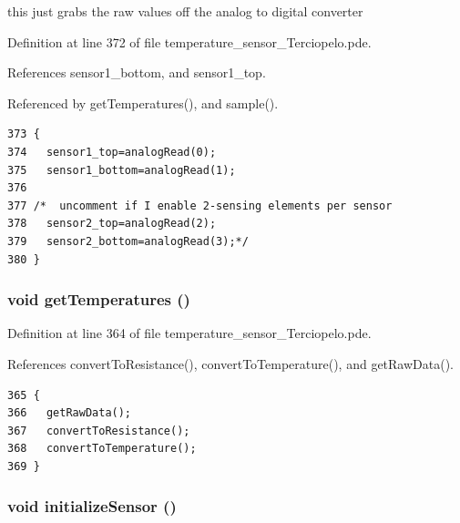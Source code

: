 this just grabs the raw values off the analog to digital converter 



Definition at line 372 of file temperature\_\-sensor\_\-Terciopelo.pde.

References sensor1\_\-bottom, and sensor1\_\-top.

Referenced by getTemperatures(), and sample().

\begin{Code}\begin{verbatim}373 {
374   sensor1_top=analogRead(0);
375   sensor1_bottom=analogRead(1);
376   
377 /*  uncomment if I enable 2-sensing elements per sensor
378   sensor2_top=analogRead(2);
379   sensor2_bottom=analogRead(3);*/
380 }
\end{verbatim}
\end{Code}


\hypertarget{temperature__sensor___terciopelo_8pde_ea28af0c7128421a38589128bb39ef1c}{
\subsubsection[{getTemperatures}]{\setlength{\rightskip}{0pt plus 5cm}void getTemperatures ()}}
\label{temperature__sensor___terciopelo_8pde_ea28af0c7128421a38589128bb39ef1c}




Definition at line 364 of file temperature\_\-sensor\_\-Terciopelo.pde.

References convertToResistance(), convertToTemperature(), and getRawData().

\begin{Code}\begin{verbatim}365 {
366   getRawData();
367   convertToResistance();
368   convertToTemperature();
369 }
\end{verbatim}
\end{Code}


\hypertarget{temperature__sensor___terciopelo_8pde_f6c9587ccbcf223f8c79f508c2fef366}{
\subsubsection[{initializeSensor}]{\setlength{\rightskip}{0pt plus 5cm}void initializeSensor ()}}
\label{temperature__sensor___terciopelo_8pde_f6c9587ccbcf223f8c79f508c2fef366}


